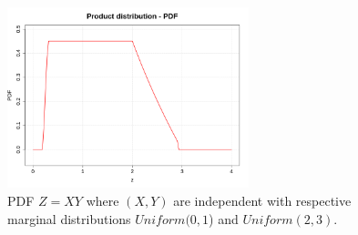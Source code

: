 \begin{figure}[H]
  \begin{center}
    \includegraphics[width=7cm]{Figures/productDist.png}
    \caption{PDF $Z=XY$ where $(X, Y)$ are independent with respective marginal distributions $Uniform(0, 1$) and $Uniform(2, 3)$.}
    \label{prodDist}
  \end{center}
\end{figure}
